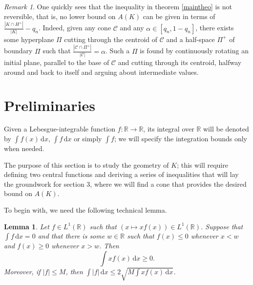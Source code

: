 \documentclass[12pt,reqno]{amsart}
\theoremstyle{plain}
\newtheorem{lema}[teor]{Lemma}
\theoremstyle{definition}
\theoremstyle{remark}
\newtheorem{nota}[teor]{Remark}
\numberwithin{equation}{section}
\newcommand{\dx}[0]{\,\mathrm{d}x}
\begin{document}
\begin{nota}\label{not1}
    One quickly sees that the inequality in theorem \ref{maintheo} is not reversible, that is, no lower bound on $A(K)$ can be given in terms of $\frac{|K\cap H^+|}{|K|}-q_n$. Indeed, given any cone $\mathcal{C}$ and any $\alpha\in[q_n,1-q_n]$, there exists some hyperplane $\Pi$ cutting through the centroid of $\mathcal{C}$ and a half-space $\Pi^+$ of boundary $\Pi$ such that $\frac{|\mathcal{C}\cap \Pi^+|}{|\mathcal{C}|}=\alpha$. Such a $\Pi$ is found by continuously rotating an initial plane, parallel to the base of $\mathcal{C}$ and cutting through its centroid, halfway around and back to itself and arguing about intermediate values.
\end{nota}

\section{Preliminaries}

Given a Lebesgue-integrable function $f:\mathbb{R}\to\mathbb{R}$, its integral over $\mathbb{R}$ will be denoted by $\int f(x)\dx$,  $\int f\dx$ or simply $\int f$; we will specify the integration bounds only when needed.

The purpose of this section is to study the geometry of $K$; this will require defining two central functions and deriving a series of inequalities that will lay the groundwork for section 3, where we will find a cone that provides the desired bound on $A(K)$.

To begin with, we need the following technical lemma.

\begin{lema}\label{intxf}
    Let $f\in L^1(\mathbb{R})$ such that $(x\mapsto xf(x))\in L^1(\mathbb{R})$. Suppose that $\int f\dx=0$ and that there is some $w\in \mathbb{R}$ such that $f(x)\leq 0$ whenever $x<w$ and $f(x)\geq 0$ whenever $x>w$. Then
    $$\int xf(x)\dx\geq 0.$$
    Moreover, if $|f|\leq M$, then $\int |f|\dx\leq 2\sqrt{M\int xf(x)\dx}$.
\end{lema}
\end{document}
